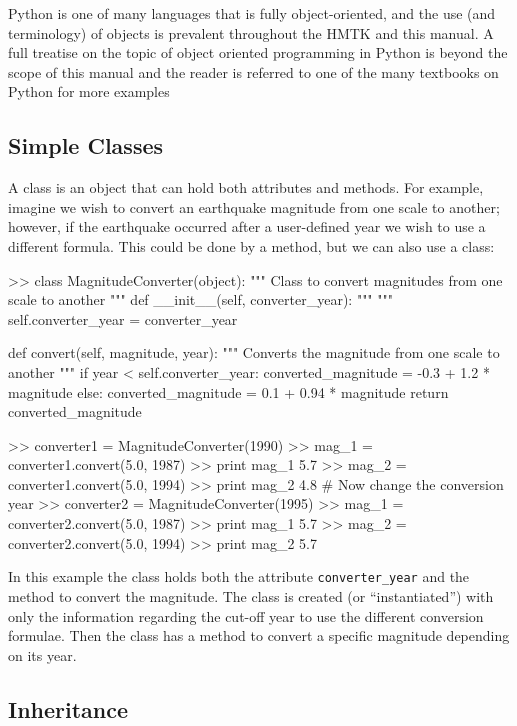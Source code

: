 Python is one of many languages that is fully object-oriented, and the use (and terminology) of objects is prevalent throughout the HMTK and this manual. A full treatise on the topic of object oriented programming in Python is beyond the scope of this manual and the reader is referred to one of the many textbooks on Python for more examples

\subsection{Simple Classes}

A class is an object that can hold both attributes and methods. For example, imagine we wish to convert an earthquake magnitude from one scale to another; however, if the earthquake occurred after a user-defined year we wish to use a different formula. This could be done by a method, but we can also use a class:

\begin{python}[frame=single]
>> class MagnitudeConverter(object):
       """
       Class to convert magnitudes from one scale to another
       """
       def __init__(self, converter_year):
           """
           """
           self.converter_year = converter_year
       
       def convert(self, magnitude, year):
           """
           Converts the magnitude from one scale to another
           """
           if year < self.converter_year:
               converted_magnitude = -0.3 + 1.2 * magnitude
           else:
               converted_magnitude = 0.1 + 0.94 * magnitude
           return converted_magnitude
                  
>> converter1 = MagnitudeConverter(1990)
>> mag_1 = converter1.convert(5.0, 1987)
>> print mag_1
5.7
>> mag_2 = converter1.convert(5.0, 1994)
>> print mag_2
4.8
# Now change the conversion year
>> converter2 = MagnitudeConverter(1995)
>> mag_1 = converter2.convert(5.0, 1987)
>> print mag_1
5.7
>> mag_2 = converter2.convert(5.0, 1994)
>> print mag_2
5.7  
\end{python}

In this example the class holds both the attribute \verb=converter_year= and the method to convert the magnitude. The class is created (or ``instantiated'') with only the information regarding the cut-off year to use the different conversion formulae. Then the class has a method to convert a specific magnitude depending on its year.

\subsection{Inheritance}

